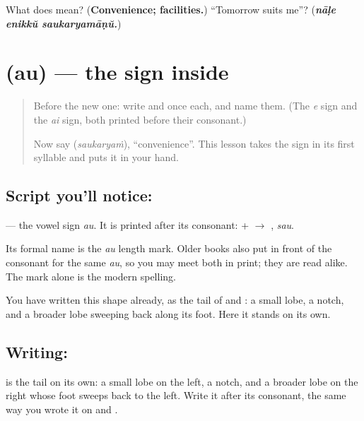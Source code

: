 \begin{tcolorbox}[breakable,colback=teal!4,colframe=teal!35!black,title={Before you move on}]
What does \textbf{} mean? (\textbf{Convenience; facilities.}) \textquotedblleft{}Tomorrow suits me\textquotedblright{}? (\emph{\textbf{nāḷe enikkŭ saukaryamāṇŭ.}})
\end{tcolorbox}
\section[\texorpdfstring{\ml{ൗ} (au)}{ൗ (au)}]{ (au) — the sign inside }

\label{lesson:ML-W344-au-sign}



\begin{quote}
Before the new one: write \textbf{} and \textbf{} once each, and name them. (The \emph{e} sign and the \emph{ai} sign, both printed before their consonant.)

Now say \textbf{} (\emph{saukaryaṁ}), \textquotedblleft{}convenience\textquotedblright{}. This lesson takes the sign in its first syllable and puts it in your hand.
\end{quote}

\subsection*{Script you'll notice: }
\textbf{} — the vowel sign \emph{au}. It is printed after its consonant: \textbf{} + \textbf{} $\to$ \textbf{}, \emph{sau}.

Its formal name is the \emph{au} length mark. Older books also put \textbf{} in front of the consonant for the same \emph{au}, so you may meet both in print; they are read alike. The mark alone is the modern spelling.

You have written this shape already, as the tail of \textbf{} and \textbf{}: a small lobe, a notch, and a broader lobe sweeping back along its foot. Here it stands on its own.

\subsection*{Writing: }
\textbf{} is the tail on its own: a small lobe on the left, a notch, and a broader lobe on the right whose foot sweeps back to the left. Write it after its consonant, the same way you wrote it on \textbf{} and \textbf{}.

